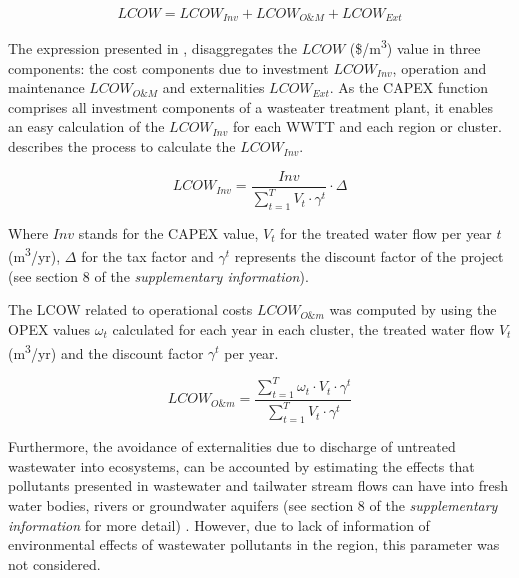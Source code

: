 \begin{equation}\label{eq:lcow}
LCOW = LCOW_{Inv} + LCOW_{O\&M} + LCOW_{Ext}
\end{equation}

The expression presented in , disaggregates the $LCOW$ (\$/m\textsuperscript{3}) value in three components: the cost components due to investment $LCOW_{Inv}$, operation and maintenance $LCOW_{O\&M}$ and externalities $LCOW_{Ext}$. As the CAPEX function comprises all investment components of a wasteater treatment plant, it enables an easy calculation of the $LCOW_{Inv}$ for each WWTT and each region or cluster.  describes the process to calculate the $LCOW_{Inv}$.

\begin{equation}\label{eq:lcowinv}
LCOW_{Inv} = \frac{Inv}{\sum_{t=1}^{T} V_{t}\cdot\gamma^{t}}\cdot\Delta
\end{equation}

Where $Inv$ stands for the CAPEX value, $V_{t}$ for the treated water flow per year $t$ (m\textsuperscript{3}/yr), $\Delta$ for the tax factor and $\gamma^{t}$ represents the discount factor of the project (see section 8 of the \textit{supplementary information}).

The LCOW related to operational costs $LCOW_{O\&m}$  was computed by using the OPEX values $\omega_{t}$ calculated for each year in each cluster, the treated water flow $V_{t}$ (m\textsuperscript{3}/yr) and the discount factor $\gamma^t$ per year.

\begin{equation}\label{eq:lcowom}
LCOW_{O\&m} = \frac{\sum_{t=1}^{T} \omega_{t}\cdot V_{t}\cdot\gamma^{t}}{\sum_{t=1}^{T} V_{t}\cdot\gamma^{t}}
\end{equation}

Furthermore, the avoidance of externalities due to discharge of untreated wastewater into ecosystems, can be accounted by estimating the effects that pollutants presented in wastewater and tailwater stream flows can have into fresh water bodies, rivers or groundwater aquifers (see section 8 of the \textit{supplementary information} for more detail) \cite{Assessmentwastewatertreatment2012}. However, due to lack of information of environmental effects of wastewater pollutants in the region, this parameter was not considered.